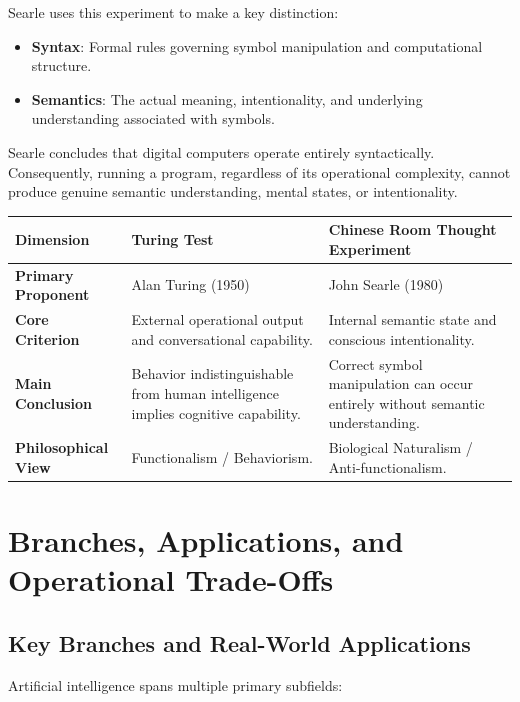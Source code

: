 \documentclass[12pt]{report}
\begin{document}
Searle uses this experiment to make a key distinction:
\begin{itemize}
    \item \textbf{Syntax}: Formal rules governing symbol manipulation and computational structure.
    \item \textbf{Semantics}: The actual meaning, intentionality, and underlying understanding associated with symbols.
\end{itemize}

Searle concludes that digital computers operate entirely syntactically. Consequently, running a program, regardless of its operational complexity, cannot produce genuine semantic understanding, mental states, or intentionality.

\begin{table}[htbp]
\centering
\begin{tabularx}{\textwidth}{@{} >{\raggedright\arraybackslash}p{3cm} X X @{}}
\toprule
\textbf{Dimension} & \textbf{Turing Test} & \textbf{Chinese Room Thought Experiment} \\
\midrule
\textbf{Primary Proponent} & Alan Turing (1950) & John Searle (1980) \\
\textbf{Core Criterion} & External operational output and conversational capability. & Internal semantic state and conscious intentionality. \\
\textbf{Main Conclusion} & Behavior indistinguishable from human intelligence implies cognitive capability. & Correct symbol manipulation can occur entirely without semantic understanding. \\
\textbf{Philosophical View} & Functionalism / Behaviorism. & Biological Naturalism / Anti-functionalism. \\
\bottomrule
\end{tabularx}
\end{table}


\section{Branches, Applications, and Operational Trade-Offs}

\subsection{Key Branches and Real-World Applications}

Artificial intelligence spans multiple primary subfields:
\end{document}
